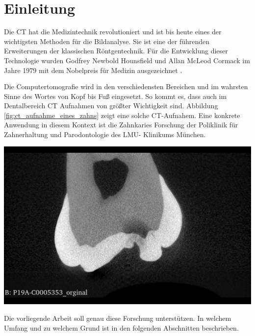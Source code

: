 \chapter{Einleitung}
\label{chap:einleitung} Die \ac{CT} hat die Medizintechnik revolutioniert und
ist bis heute eines der wichtigsten Methoden für die Bildanalyse. Sie ist eine der
führenden Erweiterungen der klassischen Röntgentechnik. Für die Entwicklung
dieser Technologie wurden Godfrey Newbold Hounsfield und Allan McLeod Cormack im
Jahre 1979 mit dem Nobelpreis für Medizin ausgezeichnet \citep[Seite12]{handels2000}.

\begin{minipage}{0.40\textwidth}
	Die Computertomografie wird in den verschiedensten Bereichen und im wahrsten Sinne
	des Wortes von Kopf bis Fuß eingesetzt. So kommt es, dass auch im Dentalbereich
	CT Aufnahmen von größter Wichtigkeit sind. Abbildung
	\ref{fig:ct_aufnahme_eines_zahns} zeigt eine solche CT-Aufnahem. Eine konkrete
	Anwendung in diesem Kontext ist die Zahnkaries Forschung der Poliklinik für Zahnerhaltung
	und Parodontologie des LMU- Klinikums München.
\end{minipage}
\hfill
\begin{minipage}{0.50\textwidth}
	\centering
	\includegraphics[scale=0.2, width=\textwidth]{img/micro_ct_orginal.jpg}
	 \label{fig:ct_aufnahme_eines_zahns}
\end{minipage}

Die vorliegende Arbeit soll genau diese Forschung unterstützen. In welchem
Umfang und zu welchem Grund ist in den folgenden Abschnitten beschrieben.


